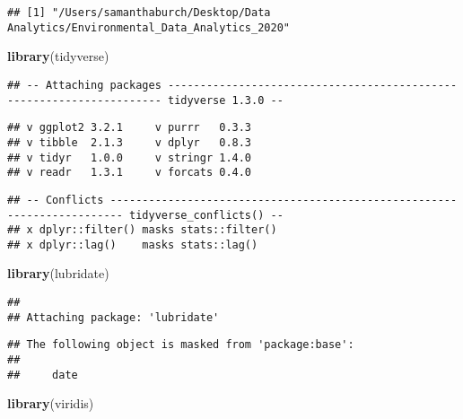 \documentclass[]{article}
\newenvironment{Shaded}{\begin{snugshade}}{\end{snugshade}}
\newcommand{\CommentTok}[1]{\textcolor[rgb]{0.56,0.35,0.01}{\textit{#1}}}
\newcommand{\KeywordTok}[1]{\textcolor[rgb]{0.13,0.29,0.53}{\textbf{#1}}}
\newcommand{\NormalTok}[1]{#1}
\begin{document}
\begin{Shaded}
\end{Shaded}

\begin{verbatim}
## [1] "/Users/samanthaburch/Desktop/Data Analytics/Environmental_Data_Analytics_2020"
\end{verbatim}

\begin{Shaded}
\begin{Highlighting}[]
\KeywordTok{library}\NormalTok{(tidyverse)}
\end{Highlighting}
\end{Shaded}

\begin{verbatim}
## -- Attaching packages --------------------------------------------------------------------- tidyverse 1.3.0 --
\end{verbatim}

\begin{verbatim}
## v ggplot2 3.2.1     v purrr   0.3.3
## v tibble  2.1.3     v dplyr   0.8.3
## v tidyr   1.0.0     v stringr 1.4.0
## v readr   1.3.1     v forcats 0.4.0
\end{verbatim}

\begin{verbatim}
## -- Conflicts ------------------------------------------------------------------------ tidyverse_conflicts() --
## x dplyr::filter() masks stats::filter()
## x dplyr::lag()    masks stats::lag()
\end{verbatim}

\begin{Shaded}
\begin{Highlighting}[]
\KeywordTok{library}\NormalTok{(lubridate)}
\end{Highlighting}
\end{Shaded}

\begin{verbatim}
## 
## Attaching package: 'lubridate'
\end{verbatim}

\begin{verbatim}
## The following object is masked from 'package:base':
## 
##     date
\end{verbatim}

\begin{Shaded}
\begin{Highlighting}[]
\KeywordTok{library}\NormalTok{(viridis)}
\end{Highlighting}
\end{Shaded}
\end{document}
